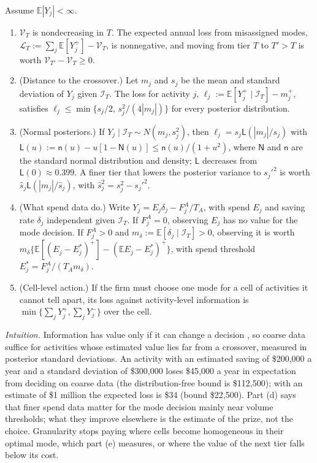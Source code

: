 \begin{proposition}\label{prop:tasks-granularity}
Assume $\mathbb E|Y_j|<\infty$.
\begin{enumerate}
\item[(a)] $\mathcal V_T$ is nondecreasing in $T$. The expected annual loss from misassigned modes, $\mathcal L_T:=\sum_j\mathbb E[Y_j^+]-\mathcal V_T$, is nonnegative, and moving from tier $T$ to $T'>T$ is worth $\mathcal V_{T'}-\mathcal V_T\ge 0$.
\item[(b)] (Distance to the crossover.) Let $m_j$ and $s_j$ be the mean and standard deviation of $Y_j$ given $\mathcal I_T$. The loss for activity $j$, $\ell_j:=\mathbb E[Y_j^+\mid\mathcal I_T]-m_j^+$, satisfies $\ell_j\le\min\{s_j/2,\,s_j^2/(4|m_j|)\}$ for every posterior distribution.
\item[(c)] (Normal posteriors.) If $Y_j\mid\mathcal I_T\sim N(m_j,s_j^2)$, then $\ell_j=s_j\mathsf L(|m_j|/s_j)$ with $\mathsf L(u):=\mathsf n(u)-u[1-\mathsf N(u)]\le\mathsf n(u)/(1+u^2)$, where $\mathsf N$ and $\mathsf n$ are the standard normal distribution and density; $\mathsf L$ decreases from $\mathsf L(0)\approx 0.399$. A finer tier that lowers the posterior variance to $s_j'^2$ is worth $\hat s_j\mathsf L(|m_j|/\hat s_j)$, with $\hat s_j^2=s_j^2-s_j'^2$.
\item[(d)] (What spend data do.) Write $Y_j=E_j\delta_j-F^A_j/T_A$, with spend $E_j$ and saving rate $\delta_j$ independent given $\mathcal I_T$. If $F^A_j=0$, observing $E_j$ has no value for the mode decision. If $F^A_j>0$ and $m_\delta:=\mathbb E[\delta_j\mid\mathcal I_T]>0$, observing it is worth $m_\delta\{\mathbb E[(E_j-E^*_j)^+]-(\mathbb E E_j-E^*_j)^+\}$, with spend threshold $E^*_j=F^A_j/(T_Am_\delta)$.
\item[(e)] (Cell-level action.) If the firm must choose one mode for a cell of activities it cannot tell apart, its loss against activity-level information is $\min\{\sum_jY_j^+,\sum_jY_j^-\}$ over the cell.
\end{enumerate}
\end{proposition}

\noindent\emph{Intuition.} Information has value only if it can change a decision \citep{howard1966information}, so coarse data suffice for activities whose estimated value lies far from a crossover, measured in posterior standard deviations. An activity with an estimated saving of \$200{,}000 a year and a standard deviation of \$300{,}000 loses \$45{,}000 a year in expectation from deciding on coarse data (the distribution-free bound is \$112{,}500); with an estimate of \$1 million the expected loss is \$34 (bound \$22{,}500). Part (d) says that finer spend data matter for the mode decision mainly near volume thresholds; what they improve elsewhere is the estimate of the prize, not the choice. Granularity stops paying where cells become homogeneous in their optimal mode, which part (e) measures, or where the value of the next tier falls below its cost.

